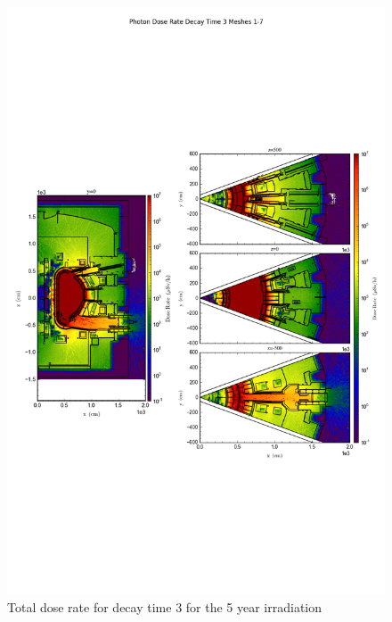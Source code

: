 \documentclass[12pt]{article}
\begin{document}
\begin{figure}[ht!]
\centering
\includegraphics[trim={0cm 8cm, 0cm 8cm},clip,scale=0.75]{../plots/final_model_with_b4c/5year/Photon_Dose_Rate_Decay_Time_3_Meshes_1-7.png}
\caption{Total dose rate for decay time 3 for the 5 year irradiation}
\label{fig:photons_5y_dc3_nob4c_dose}
\end{figure}
\end{document}
